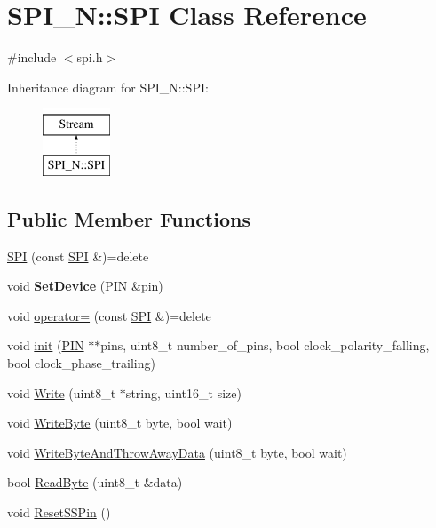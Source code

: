 \hypertarget{class_s_p_i___n_1_1_s_p_i}{}\section{S\+P\+I\+\_\+N\+:\+:S\+PI Class Reference}
\label{class_s_p_i___n_1_1_s_p_i}


{\ttfamily \#include $<$spi.\+h$>$}

Inheritance diagram for S\+P\+I\+\_\+N\+:\+:S\+PI\+:\begin{figure}[H]
\begin{center}
\leavevmode
\includegraphics[height=2.000000cm]{class_s_p_i___n_1_1_s_p_i}
\end{center}
\end{figure}
\subsection*{Public Member Functions}
\begin{DoxyCompactItemize}
\item 
\hyperlink{class_s_p_i___n_1_1_s_p_i_ab486ba0f0d9ec880520e568762cc6c7d}{S\+PI} (const \hyperlink{class_s_p_i___n_1_1_s_p_i}{S\+PI} \&)=delete
\item 
void {\bfseries Set\+Device} (\hyperlink{struct_s_p_i___n_1_1_p_i_n}{P\+IN} \&pin)\hypertarget{class_s_p_i___n_1_1_s_p_i_ad04a79c8e9139545a96af71245ce8d18}{}\label{class_s_p_i___n_1_1_s_p_i_ad04a79c8e9139545a96af71245ce8d18}

\item 
void \hyperlink{class_s_p_i___n_1_1_s_p_i_aabc66612d396c2b70e5cbdba405dbfe5}{operator=} (const \hyperlink{class_s_p_i___n_1_1_s_p_i}{S\+PI} \&)=delete
\item 
void \hyperlink{class_s_p_i___n_1_1_s_p_i_a9812909f119712e57e2d452b859509ee}{init} (\hyperlink{struct_s_p_i___n_1_1_p_i_n}{P\+IN} $\ast$$\ast$pins, uint8\+\_\+t number\+\_\+of\+\_\+pins, bool clock\+\_\+polarity\+\_\+falling, bool clock\+\_\+phase\+\_\+trailing)
\item 
void \hyperlink{class_s_p_i___n_1_1_s_p_i_a3e2e2a7f02ffa5003548a1b9d820ce9a}{Write} (uint8\+\_\+t $\ast$string, uint16\+\_\+t size)
\item 
void \hyperlink{class_s_p_i___n_1_1_s_p_i_a542dc8e88203de7040ce9926d06b9463}{Write\+Byte} (uint8\+\_\+t byte, bool wait)
\item 
void \hyperlink{class_s_p_i___n_1_1_s_p_i_a05bcca2e033422b2e6ad570320d03fcb}{Write\+Byte\+And\+Throw\+Away\+Data} (uint8\+\_\+t byte, bool wait)
\item 
bool \hyperlink{class_s_p_i___n_1_1_s_p_i_a57ee9af74ec6a2d37001674f37f46344}{Read\+Byte} (uint8\+\_\+t \&data)
\item 
void \hyperlink{class_s_p_i___n_1_1_s_p_i_a6daa4720c8710e177f71ac318b96a3f8}{Reset\+S\+S\+Pin} ()
\end{DoxyCompactItemize}
